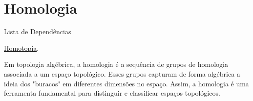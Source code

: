 \section{Homologia}
\label{homologia}

\begin{titlemize}{Lista de Dependências}
	\item \hyperref[homotopia]{Homotopia}.\\ %
\end{titlemize}

Em topologia algébrica, a homologia é a sequência de grupos de homologia associada a um espaço topológico. Esses grupos capturam de forma algébrica a ideia dos "buracos" em diferentes dimensões no espaço. Assim, a homologia é uma ferramenta fundamental para distinguir e classificar espaços topológicos.









